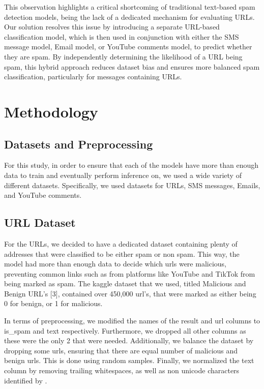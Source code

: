 \documentclass{article}
\begin{document}
\newline
\newline
This observation highlights a critical shortcoming of traditional text-based spam detection models, being the lack of a dedicated mechanism for evaluating URLs. Our solution resolves this issue by introducing a separate URL-based classification model, which is then used in conjunction with either the SMS message model, Email model, or YouTube comments model, to predict whether they are spam. By independently determining the likelihood of a URL being spam, this hybrid approach reduces dataset bias and ensures more balanced spam classification, particularly for messages containing URLs.	


\section{Methodology}


\subsection{Datasets and Preprocessing}

For this study, in order to ensure that each of the models have more than enough data to train and eventually perform inference on, we used a wide variety of different datasets. Specifically, we used datasets for URLs, SMS messages, Emails, and YouTube comments.

\subsection*{URL Dataset}

For the URLs, we decided to have a dedicated dataset containing plenty of addresses that were classified to be either spam or non spam. This way, the model had more than enough data to decide which urls were malicious, preventing common links such as from platforms like YouTube and TikTok from being marked as spam. The kaggle dataset that we used, titled Malicious and Benign URL’s [3], contained over 450,000 url’s, that were marked as either being 0 for benign, or 1 for malicious. 


\noindent
In terms of preprocessing, we modified the names of the result and url columns to is\_spam and text respectively. Furthermore, we dropped all other columns as these were the only 2 that were needed. Additionally, we balance the dataset by dropping some urls, ensuring that there are equal number of malicious and benign urls. This is done using random samples. Finally, we normalized the text column by removing trailing whitespaces, as well as non unicode characters identified by \textquestiondown .
\end{document}
